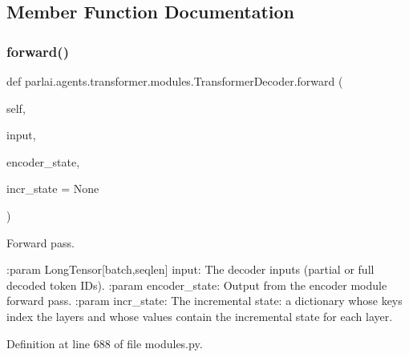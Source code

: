 \subsection{Member Function Documentation}
\mbox{\label{classparlai_1_1agents_1_1transformer_1_1modules_1_1TransformerDecoder_a19b2e9eecef1384bcfa9f772cac24a20}} 
\subsubsection{\texorpdfstring{forward()}{forward()}}
{\footnotesize\ttfamily def parlai.\+agents.\+transformer.\+modules.\+Transformer\+Decoder.\+forward (\begin{DoxyParamCaption}\item[{}]{self,  }\item[{}]{input,  }\item[{}]{encoder\+\_\+state,  }\item[{}]{incr\+\_\+state = {\ttfamily None} }\end{DoxyParamCaption})}

\begin{DoxyVerb}Forward pass.

:param LongTensor[batch,seqlen] input:
    The decoder inputs (partial or full decoded token IDs).
:param encoder_state:
    Output from the encoder module forward pass.
:param incr_state:
    The incremental state: a dictionary whose keys index the layers and whose
    values contain the incremental state for each layer.
\end{DoxyVerb}
 

Definition at line 688 of file modules.\+py.


